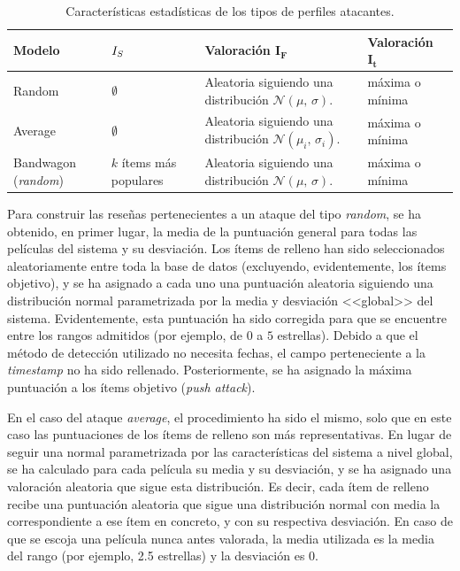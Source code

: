 \begin{table}
\begin{centering}
	\begin{tabular}{@{}p{5em} p{6em} p{11em} p{8em}@{}}
		\toprule
		\textbf{Modelo} & $\hfil{I_S}$ & \textbf{Valoración} $\mathbf{I_F}$ &  \textbf{Valoración} $\mathbf{I_t}$\\ 
		\midrule
		Random & $\hfil\emptyset$ & Aleatoria siguiendo una distribución $\mathcal{N}(\mu,\,\sigma)$. & máxima o mínima \\
		Average & $\hfil\emptyset$ & Aleatoria siguiendo una distribución $\mathcal{N}(\mu_i,\,\sigma_i)$. & máxima o mínima\\
		Bandwagon (\textit{random}) &\centering$k$ ítems más populares & Aleatoria siguiendo una distribución $\mathcal{N}(\mu,\,\sigma)$. & máxima o mínima\\
		\bottomrule
	\end{tabular}
	\caption[Experimentación: características de ataques a detectar]{Características estadísticas de los tipos de perfiles atacantes.}
	\label{ataques_coforest}	
\end{centering}
\end{table}

Para construir las reseñas pertenecientes a un ataque del tipo \textit{random}, se ha obtenido, en primer lugar, la media de la puntuación general para todas las películas del sistema y su desviación. Los ítems de relleno han sido seleccionados aleatoriamente entre toda la base de datos (excluyendo, evidentemente, los ítems objetivo), y se ha asignado a cada uno una puntuación aleatoria siguiendo una distribución normal parametrizada por la media y desviación <<global>> del sistema. Evidentemente, esta puntuación ha sido corregida para que se encuentre entre los rangos admitidos (por ejemplo, de $0$ a $5$ estrellas). Debido a que el método de detección utilizado no necesita fechas, el campo perteneciente a la \textit{timestamp} no ha sido rellenado. Posteriormente, se ha asignado la máxima puntuación a los ítems objetivo (\textit{push attack}).

En el caso del ataque \textit{average}, el procedimiento ha sido el mismo, solo que en este caso las puntuaciones de los ítems de relleno son más representativas. En lugar de seguir una normal parametrizada por las características del sistema a nivel global, se ha calculado para cada película su media y su desviación, y se ha asignado una valoración aleatoria que sigue esta distribución. Es decir, cada ítem de relleno recibe una puntuación aleatoria que sigue una distribución normal con media la correspondiente a ese ítem en concreto, y con su respectiva desviación. En caso de que se escoja una película nunca antes valorada, la media utilizada es la media del rango (por ejemplo, 2.5 estrellas) y la desviación es $0$.

